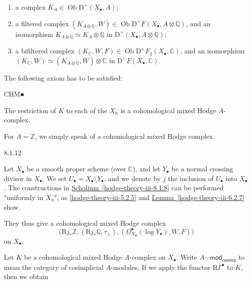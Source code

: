     
 \begin{enumerate}
      
 \item[(𝛼)]
        a complex \(K_A\in \operatorname {Ob}\mathrm {D}^+(X_\bullet ,A)\);
      


      
 \item[(𝛽)]
        a filtered complex \((K_{A\otimes \mathbb {Q}},W)\in \operatorname {Ob}\mathrm {D}^+F(X_\bullet ,A\otimes \mathbb {Q})\), and an isomorphism \(K_{A\otimes \mathbb {Q}}\simeq  K_A\otimes \mathbb {Q}\) in \(\mathrm {D}^+(X_\bullet ,A\otimes \mathbb {Q})\);
      


      
 \item[(𝛾)]
        a bifiltered complex \((K_\mathbb {C},W,F)\in \operatorname {Ob}\mathrm {D}^+F_2(X_\bullet ,\mathbb {C})\), and an isomorphism \((K_\mathbb {C},W)\simeq (K_{A\otimes \mathbb {Q}},W)\otimes \mathbb {C}\) in \(\mathrm {D}^+F(X_\bullet ,\mathbb {C})\).
      

    \end{enumerate}\par{}The following axiom has to be satisfied:

    \begin{axiom}{CHM●}\label{hodge-theory-iii-8.1.11-chmbullet}\skipsinglepar\par{}The restriction of \(K\) to each of the \(X_n\) is a cohomological mixed Hodge \(A\)-complex.\end{axiom}\par{}For \(A=\mathbb {Z}\), we simply speak of a cohomological mixed Hodge complex.\begin{example}{8.1.12}\label{hodge-theory-iii-8.1.12}\skipsinglepar\par{}Let \(X_\bullet \) be a smooth proper scheme (over \(\mathbb {C}\)), and let \(Y_\bullet \) be a normal crossing divisor in \(X_\bullet \).
    We set \(U_\bullet =X_\bullet \setminus  Y_\bullet \), and we denote by \(j\) the inclusion of \(U_\bullet \) into \(X_\bullet \).
    The constructions in \hyperref[hodge-theory-iii-8.1.8]{Scholium~\ref*{hodge-theory-iii-8.1.8}} can be performed "uniformly in \(X_n\)", as \cref{hodge-theory-iii-5.2.5} and \hyperref[hodge-theory-iii-6.2.7]{Lemma~\ref*{hodge-theory-iii-6.2.7}} show.
    
    They thus give a cohomological mixed Hodge complex
    \[       \big (\mathrm {R} j_*\mathbb {Z}, (\mathrm {R} j_*\mathbb {Q},\tau _{\leqslant }), (\Omega _{X_\bullet }^\bullet (\log  Y_\bullet ),W,F)\big )     \]
    on \(X_\bullet \).\end{example}\label{hodge-theory-iii-8.1.13}\par{}Let \(K\) be a cohomological mixed Hodge \(A\)-complex on \(X_\bullet \).
    Write \(A\mathsf {-mod}_\mathsf {cosimp}\) to mean the category of cosimplicial \(A\)-modules.
    If we apply the functor \(\mathrm {R}\Gamma ^\bullet \) to \(K\), then we obtain

